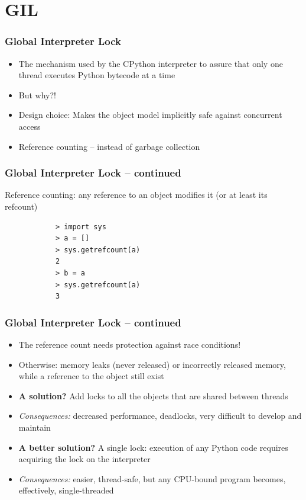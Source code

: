 \documentclass{beamer}
\begin{document}
    \section{GIL}

    \begin{frame}
        \frametitle{Global Interpreter Lock}

        \begin{itemize}
            \item The mechanism used by the CPython interpreter to assure that only one thread executes Python bytecode at a time
            \item But why?!
            \item Design choice: Makes the object model implicitly safe against concurrent access
            \item Reference counting -- instead of garbage collection
        \end{itemize}

    \end{frame}

    \begin{frame}[fragile]
        \frametitle{Global Interpreter Lock -- continued}

        Reference counting:
        any reference to an object modifies it (or at least its refcount)
        \begin{verbatim}
            > import sys
            > a = []
            > sys.getrefcount(a)
            2
            > b = a
            > sys.getrefcount(a)
            3
        \end{verbatim}
    \end{frame}

    \begin{frame}
        \frametitle{Global Interpreter Lock -- continued}
        \begin{itemize}
            \item The reference count needs protection against race conditions!
            \item Otherwise: memory leaks (never released) or incorrectly released memory,
            while a reference to the object still exist
            \item \textbf{A solution?} Add locks to all the objects that are shared between threads
            \item \emph{Consequences:} decreased performance, deadlocks, very difficult to develop and maintain
            \item \textbf{A better solution?} A single lock: execution of any Python code
            requires acquiring the lock on the interpreter
            \item \emph{Consequences:} easier, thread-safe, but any CPU-bound program becomes, effectively, single-threaded
        \end{itemize}

    \end{frame}
\end{document}
